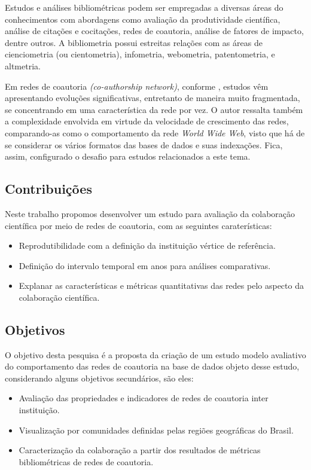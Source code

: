 \documentclass[12pt]{article}
\begin{document}
Estudos e análises bibliométricas podem ser empregadas a diversas áreas do conhecimentos com abordagens como avaliação da produtividade científica, análise de citações e cocitações, redes de coautoria, análise de fatores de impacto, dentre outros. A bibliometria possui estreitas relações com as áreas de cienciometria (ou cientometria), infometria, webometria, patentometria, e altmetria.

Em redes de coautoria \textit{(co-authorship network)}, conforme \cite{Barabasi2001}, estudos vêm apresentando evoluções significativas, entretanto de maneira muito fragmentada, se concentrando em uma característica da rede por vez. 
O autor ressalta também a complexidade envolvida em virtude da velocidade de crescimento das redes, comparando-as como o comportamento da rede \textit{World Wide Web}, visto que há de se considerar os vários formatos das bases de dados e suas indexações.
Fica, assim, configurado o desafio para estudos relacionados a este tema.



\subsection{\textbf{Contribuições}}
  
Neste trabalho propomos desenvolver um estudo para avaliação da colaboração científica por meio de redes de coautoria, com as seguintes caraterísticas:

\begin{itemize}
\item Reprodutibilidade com a definição da instituição vértice de referência.
\item Definição do intervalo temporal em anos para análises comparativas.
\item Explanar as características e métricas quantitativas das redes pelo aspecto da colaboração científica.
\end{itemize}

\subsection{\textbf{Objetivos}}

O objetivo desta pesquisa é a proposta da criação de um estudo modelo avaliativo do comportamento das redes de coautoria na base de dados objeto desse estudo, considerando alguns objetivos secundários, são eles:

\begin{itemize}
\item Avaliação das propriedades e indicadores de redes de coautoria inter instituição.
\item Visualização por comunidades definidas pelas regiões geográficas do Brasil.
\item Caracterização da colaboração a partir dos resultados de métricas bibliométricas de redes de coautoria.
\end{itemize}
\end{document}
